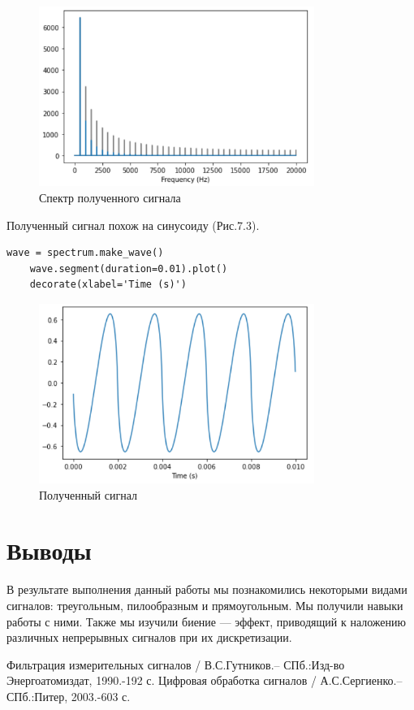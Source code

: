 \documentclass[a4paper,12pt]{report}
\begin{document}
\begin{figure}[H]
        \centering
        \includegraphics[width=0.8\textwidth]{fig7-2.PNG}
        \caption{Спектр полученного сигнала}
        \label{fig:fig7-2}
\end{figure}

    Полученный сигнал похож на синусоиду (Рис.7.3).
\begin{lstlisting}[caption=Получение сигнала]
    wave = spectrum.make_wave()
    wave.segment(duration=0.01).plot()
    decorate(xlabel='Time (s)')
\end{lstlisting}

\begin{figure}[H]
        \centering
        \includegraphics[width=0.8\textwidth]{fig7-3.PNG}
        \caption{Полученный сигнал}
        \label{fig:fig7-3}
\end{figure}

\chapter{Выводы}
    В результате выполнения данный работы мы познакомились некоторыми видами сигналов: треугольным, пилообразным и прямоугольным. Мы получили навыки работы с ними. 
    Также мы изучили биение — эффект, приводящий к наложению различных непрерывных сигналов при их дискретизации.

\begin{thebibliography}{}
      Фильтрация измерительных сигналов / В.С.Гутников.– СПб.:Изд-во Энергоатомиздат, 1990.-192 с.
      Цифровая обработка сигналов / А.С.Сергиенко.– СПб.:Питер, 2003.-603 с.
\end{thebibliography}
\end{document}
